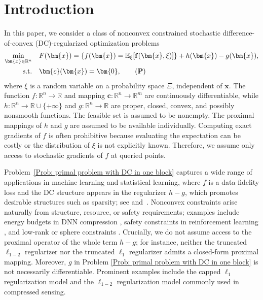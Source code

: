 \documentclass{article}
\theoremstyle{plain}
\theoremstyle{definition}
\theoremstyle{remark}
\newcommand{\RR}{\mathbb{R}}
\newcommand{\EE}{\mathbb{E}}
\newcommand{\bx}{\bm{x}}
\newcommand{\bc}{\bm{c}}
\newcommand{\tf}{\mathbf{f}}
\numberwithin{equation}{section}
\begin{document}
\section{Introduction}
In this paper, we consider a class of nonconvex constrained stochastic difference-of-convex (DC)-regularized optimization problems
\begin{align}
\label{Prob: primal problem with DC in one block}
   \min_{\bx \in \RR^n } \quad  & F(\bx) = \{f(\bx) = \EE_{\xi}[\tf(\bx,\xi)]\} + h(\bx) - g(\bx), \notag  \\
   \text{s.t.} \quad & \bc(\bx) = \bm{0},  \tag{{\bf P}}
\end{align}
where $\xi$ is a random variable on a probability space $\Xi$, independent of $\bx$. The function $f:\RR^n\!\to\!\RR$ and mapping $\bc:\RR^n\!\to\!\RR^m$ are continuously differentiable, while $h:\RR^n\!\to\!\RR\cup\{+\infty\}$ and $g:\RR^n\!\to\!\RR$ are proper, closed, convex, and possibly nonsmooth functions. The feasible set is assumed to be nonempty.
The proximal mappings of \(h\) and \(g\) are assumed to be available
individually. Computing exact gradients of $f$ is often prohibitive because evaluating the expectation can be costly or the distribution of $\xi$ is not explicitly known. Therefore, we assume only access to stochastic gradients of $f$ at queried points.

Problem~\eqref{Prob: primal problem with DC in one block} captures a wide
range of applications in machine learning and statistical learning, where
\(f\) is a data-fidelity loss and the DC structure appears in the regularizer \(h-g\), which promotes desirable structures such as sparsity; see
\citep[Table~1]{gong2013general} and~\citep{xu2019stochastic,wen2018proximal}. Nonconvex constraints arise naturally from structure, resource, or
safety requirements; examples include energy budgets in DNN compression
\citep{yang2019ecc,chen2018constraint}, safety constraints in reinforcement
learning \citep{paternain2019constrained,zhang2025exchange,zhang2026augmented}, and low-rank or sphere constraints
\citep{Roy2018GeometryAC,witten2009penalized}. Crucially, we do not assume access to the proximal operator of the whole term \(h - g\); for instance, neither the truncated $\ell_{1-2}$ regularizer \citep{ma2017truncated} nor the truncated \(\ell_1\) regularizer \citep{luo2015new} admits a closed-form proximal mapping. Moreover, \(g\) in Problem \eqref{Prob: primal problem with DC in one block} is not necessarily differentiable. Prominent examples include the capped \(\ell_1\) regularization model \citep{gong2013general} and the \(\ell_{1-2}\) regularization model \citep{yin2015minimization} commonly used in compressed sensing.
\end{document}
